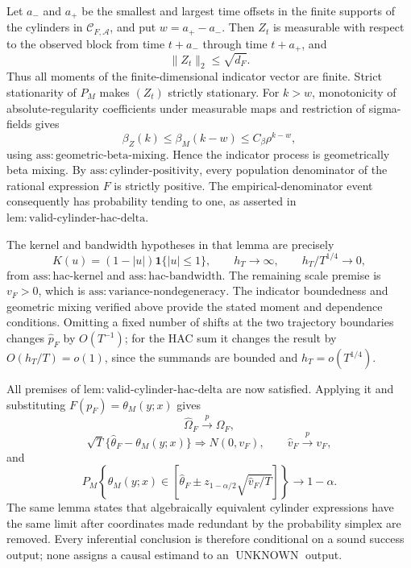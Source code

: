 Let \(a_-\) and \(a_+\) be the smallest and largest time offsets in the finite supports of the cylinders in \(\mathcal C_{F,\mathcal A}\), and put \(w=a_+-a_-\).  Then \(Z_t\) is measurable with respect to the observed block from time \(t+a_-\) through time \(t+a_+\), and
\[
 \lVert Z_t\rVert_2\leq\sqrt{d_F}.
\]
Thus all moments of the finite-dimensional indicator vector are finite.  Strict stationarity of \(P_M\) makes \((Z_t)\) strictly stationary.  For \(k>w\), monotonicity of absolute-regularity coefficients under measurable maps and restriction of sigma-fields gives
\[
 \beta_Z(k)\leq\beta_M(k-w)
 \leq C_\beta\rho^{k-w},
\]
using \(\mathrm{ass:geometric\text{-}beta\text{-}mixing}\).  Hence the indicator process is geometrically beta mixing.  By \(\mathrm{ass:cylinder\text{-}positivity}\), every population denominator of the rational expression \(F\) is strictly positive.  The empirical-denominator event consequently has probability tending to one, as asserted in \(\mathrm{lem:valid\text{-}cylinder\text{-}hac\text{-}delta}\).

The kernel and bandwidth hypotheses in that lemma are precisely
\[
 K(u)=(1-|u|)\mathbf 1\{|u|\leq1\},\qquad
 h_T\to\infty,\qquad h_T/T^{1/4}\to0,
\]
from \(\mathrm{ass:hac\text{-}kernel}\) and \(\mathrm{ass:hac\text{-}bandwidth}\).  The remaining scale premise is \(v_F>0\), which is \(\mathrm{ass:variance\text{-}nondegeneracy}\).  The indicator boundedness and geometric mixing verified above provide the stated moment and dependence conditions.  Omitting a fixed number of shifts at the two trajectory boundaries changes \(\widehat p_F\) by \(O(T^{-1})\); for the HAC sum it changes the result by \(O(h_T/T)=o(1)\), since the summands are bounded and \(h_T=o(T^{1/4})\).

All premises of \(\mathrm{lem:valid\text{-}cylinder\text{-}hac\text{-}delta}\) are now satisfied.  Applying it and substituting \(F(p_F)=\theta_M(y;x)\) gives
\[
 \widehat\Omega_F\overset p\longrightarrow\Omega_F,
\]
\[
 \sqrt T\{\widehat\theta_F-\theta_M(y;x)\}
 \Rightarrow N(0,v_F),
 \qquad
 \widehat v_F\overset p\longrightarrow v_F,
\]
and
\[
 P_M\!\left\{\theta_M(y;x)\in
 \left[\widehat\theta_F\pm
 z_{1-\alpha/2}\sqrt{\widehat v_F/T}\right]\right\}
 \longrightarrow1-\alpha.
\]
The same lemma states that algebraically equivalent cylinder expressions have the same limit after coordinates made redundant by the probability simplex are removed.  Every inferential conclusion is therefore conditional on a sound success output; none assigns a causal estimand to an \(\operatorname{UNKNOWN}\) output.

